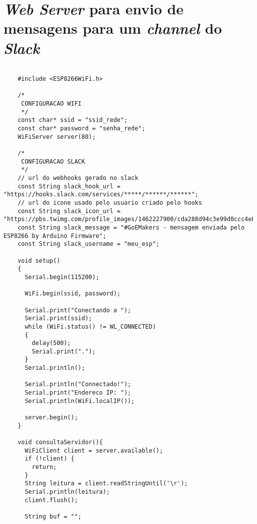 \documentclass[
	11pt,				%
	openright,			%
	twoside,			%
	a5paper,			%
	english,			%
	french,				%
	spanish,			%
	brazil,				%
	sumario=tradicional
]{abntex2}
\begin{document}
\section{\textit{Web Server} para envio de mensagens para um \textit{channel} do \textit{Slack}}
\begin{lstlisting} 

    #include <ESP8266WiFi.h>
    
    /*
     CONFIGURACAO WIFI
     */
    const char* ssid = "ssid_rede";
    const char* password = "senha_rede";
    WiFiServer server(80);
    
    /*
     CONFIGURACAO SLACK
     */
    // url do webhooks gerado no slack
    const String slack_hook_url = "https://hooks.slack.com/services/*****/******/******";
    // url do icone usado pelo usuario criado pelo hooks
    const String slack_icon_url = "https://pbs.twimg.com/profile_images/1462227900/cda288d94c3e99d0ccc4e8d1c61d7073_normal.jpg";
    const String slack_message = "#GoEMakers - mensagem enviada pelo ESP8266 by Arduino Firmware";
    const String slack_username = "meu_esp";
    
    void setup()
    { 
      Serial.begin(115200);
    
      WiFi.begin(ssid, password);
    
      Serial.print("Conectando a ");
      Serial.print(ssid);
      while (WiFi.status() != WL_CONNECTED)
      {
        delay(500);
        Serial.print(".");
      }
      Serial.println();
    
      Serial.println("Connectado!");
      Serial.print("Endereco IP: ");
      Serial.println(WiFi.localIP());
    
      server.begin();
    }
    
    void consultaServidor(){
      WiFiClient client = server.available();
      if (!client) {
        return;
      }
      String leitura = client.readStringUntil('\r');
      Serial.println(leitura);
      client.flush();
    
      String buf = "";
      

\end{lstlisting}
\end{document}
